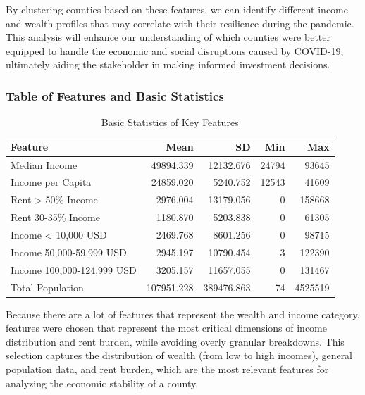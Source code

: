 \documentclass[
]{article}
\begin{document}
By clustering counties based on these features, we can identify
different income and wealth profiles that may correlate with their
resilience during the pandemic. This analysis will enhance our
understanding of which counties were better equipped to handle the
economic and social disruptions caused by COVID-19, ultimately aiding
the stakeholder in making informed investment decisions.

\subsubsection{Table of Features and Basic
Statistics}\label{table-of-features-and-basic-statistics}

\begingroup\fontsize{10}{12}\selectfont

\begin{longtable}[t]{lrrrr}
\caption{\label{tab:basic statistics}Basic Statistics of Key Features}\\
\toprule
Feature & Mean & SD & Min & Max\\
\midrule
Median Income & 49894.339 & 12132.676 & 24794 & 93645\\
Income per Capita & 24859.020 & 5240.752 & 12543 & 41609\\
Rent > 50\% Income & 2976.004 & 13179.056 & 0 & 158668\\
Rent 30-35\% Income & 1180.870 & 5203.838 & 0 & 61305\\
Income < 10,000 USD & 2469.768 & 8601.256 & 0 & 98715\\
\addlinespace
Income 50,000-59,999 USD & 2945.197 & 10790.454 & 3 & 122390\\
Income 100,000-124,999 USD & 3205.157 & 11657.055 & 0 & 131467\\
Total Population & 107951.228 & 389476.863 & 74 & 4525519\\
\bottomrule
\end{longtable}
\endgroup{}

Because there are a lot of features that represent the wealth and income
category, features were chosen that represent the most critical
dimensions of income distribution and rent burden, while avoiding overly
granular breakdowns. This selection captures the distribution of wealth
(from low to high incomes), general population data, and rent burden,
which are the most relevant features for analyzing the economic
stability of a county.
\end{document}
